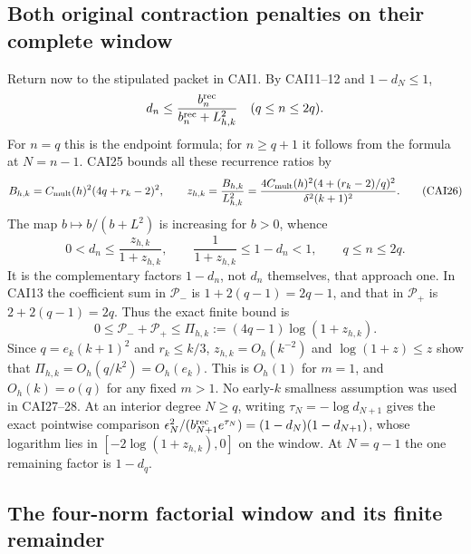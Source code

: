 \documentclass[11pt,a4paper]{article}
\begin{document}
\subsection{Both original contraction penalties on their complete window}

Return now to the stipulated packet in CAI1. By CAI11--12 and
$1-d_N\le1$,
\[
 d_n\le\frac{b_n^{\rm rec}}{b_n^{\rm rec}+L_{h,k}^2}
                         \quad(q\le n\le2q).
\]
For $n=q$ this is the endpoint formula; for $n\ge q+1$ it follows
from the formula at $N=n-1$. CAI25 bounds all these recurrence ratios by
\[
 B_{h,k}=C_{\rm mult}(h)^2(4q+r_k-2)^2,\qquad
 z_{h,k}=\frac{B_{h,k}}{L_{h,k}^2}
   =\frac{4C_{\rm mult}(h)^2(4+(r_k-2)/q)^2}{\delta^2(k+1)^2}.
 \tag{CAI26}
\]
The map $b\mapsto b/(b+L^2)$ is increasing for $b>0$, whence
\[
 0<d_n\le\frac{z_{h,k}}{1+z_{h,k}},\qquad
 \frac1{1+z_{h,k}}\le1-d_n<1,\qquad q\le n\le2q.\tag{CAI27}
\]
It is the complementary factors $1-d_n$, not $d_n$ themselves, that
approach one. In CAI13 the coefficient sum in $\mathcal P_-$ is
$1+2(q-1)=2q-1$, and that in $\mathcal P_+$ is $2+2(q-1)=2q$.
Thus the exact finite bound is
\[
 \boxed{0\le\mathcal P_-+\mathcal P_+
      \le\Pi_{h,k}:=(4q-1)\log(1+z_{h,k}).}\tag{CAI28}
\]
Since $q=e_k(k+1)^2$ and $r_k\le k/3$, $z_{h,k}=O_h(k^{-2})$ and
$\log(1+z)\le z$ show that $\Pi_{h,k}=O_h(q/k^2)=O_h(e_k)$.
This is $O_h(1)$ for $m=1$, and $O_h(k)=o(q)$ for any fixed $m>1$.
No early-$k$ smallness assumption was used in CAI27--28.
At an interior degree $N\ge q$, writing $\tau_N=-\log d_{N+1}$ gives
the exact pointwise comparison
$\epsilon_N^2/(b_{N+1}^{\rm rec}e^{\tau_N})=(1-d_N)(1-d_{N+1})$,
whose logarithm lies in $[-2\log(1+z_{h,k}),0]$ on the window.
At $N=q-1$ the one remaining factor is $1-d_q$.

\subsection{The four-norm factorial window and its finite remainder}
\end{document}

